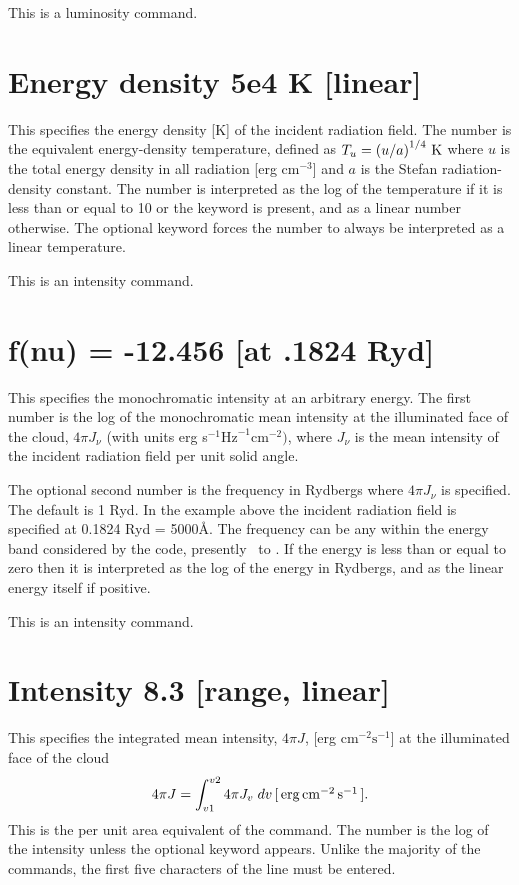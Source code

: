 This is a luminosity command.

\section{Energy density 5e4 K [linear]}

This specifies the energy density [K] of the incident radiation field.
The number is the equivalent energy-density temperature, defined as
$T_u  = \left( {u/a} \right)^{1/4} {\rm\thinspace K}$
where $u$ is the total energy density in all radiation
[erg cm$^{-3}$] and $a$ is the Stefan radiation-density constant.
The number is interpreted as the log of the temperature if it is less than or equal to 10
or the keyword  is present,
and as a linear number otherwise.
The optional keyword  forces the
number to always be interpreted as a linear temperature.

This is an intensity command.

\section{f(nu) = -12.456 [at .1824 Ryd]}

This specifies the monochromatic intensity at an arbitrary energy.  The
first number is the log of the monochromatic mean intensity at the
illuminated face of the cloud,
$4\pi J_\nu$ (with units erg
s$^{-1}\mathrm{Hz}^{-1} \mathrm{cm}^{-2})$, where
$J_{\nu}$ is the mean intensity of the incident radiation field
per unit solid angle.

The optional second number is the frequency in Rydbergs where
$4\pi J_\nu$ is specified.
The default is 1 Ryd.
In the example above the incident radiation field is
specified at 0.1824 Ryd = 5000\AA.
The frequency can be any within the energy
band considered by the code,
presently \emm\ to \egamry .
If the energy is less than or equal to zero then it is interpreted as the
log of the energy in Rydbergs, and as the linear energy itself if positive.

This is an intensity command.

\section{Intensity 8.3 [range, linear]}

This specifies the integrated mean intensity,
$4\pi J$, [erg cm$^{-2}\mathrm{s}^{-1}$] at the
illuminated face of the cloud
\begin{equation}
4\pi J= \int_{v1}^{v2}4\pi J_v \; dv \,[\mbox{${\rm\thinspace erg}{\rm\thinspace cm}^{-2}{\rm\thinspace s}^{-1}\,$}] .
\end{equation}
This is the per unit area equivalent of the 
command.
The number is the log of the intensity unless the optional
keyword  appears.
Unlike the majority of the commands, the first
five characters of the line must be entered.

